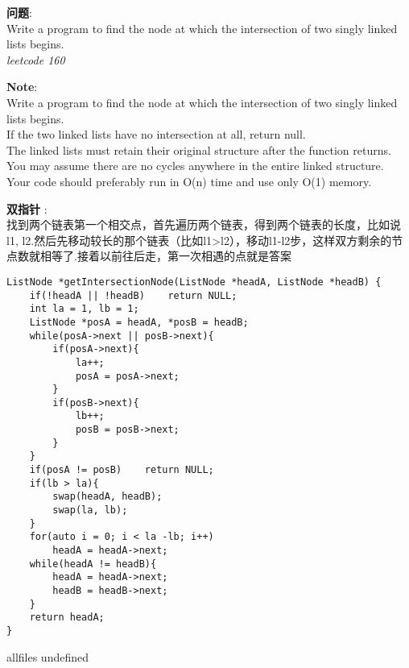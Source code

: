 \documentclass{article}
\begin{document}
\begin{CJK}{UTF8}{gbsn}     %

\else
    
\begin{description}
    \item{\textbf{问题}}: \\
Write a program to find the node at which the intersection of two singly linked lists begins.\\
\textit{leetcode 160}
    \item{\textbf{Note}}: \\
Write a program to find the node at which the intersection of two singly linked lists begins.\\
If the two linked lists have no intersection at all, return null. \\
The linked lists must retain their original structure after the function returns. \\
You may assume there are no cycles anywhere in the entire linked structure. \\
Your code should preferably run in O(n) time and use only O(1) memory.
    \item{\textbf{双指针}} : 
    \\找到两个链表第一个相交点，首先遍历两个链表，得到两个链表的长度，比如说l1, l2.然后先移动较长的那个链表（比如l1>l2），移动l1-l2步，这样双方剩余的节点数就相等了.接着以前往后走，第一次相遇的点就是答案
    \begin{lstlisting}
ListNode *getIntersectionNode(ListNode *headA, ListNode *headB) {
	if(!headA || !headB)	return NULL;
	int la = 1, lb = 1;
	ListNode *posA = headA, *posB = headB;
	while(posA->next || posB->next){
		if(posA->next){
			la++;
			posA = posA->next;
		}
		if(posB->next){
			lb++;
			posB = posB->next;
		}
	}
	if(posA != posB)	return NULL;
	if(lb > la){
		swap(headA, headB);
		swap(la, lb);
	}
	for(auto i = 0; i < la -lb; i++)
		headA = headA->next;
	while(headA != headB){
		headA = headA->next;
		headB = headB->next;
	}
	return headA;
}
    \end{lstlisting}
\end{description}

\fi

\ifx allfiles undefined
\end{CJK}
\end{document}
